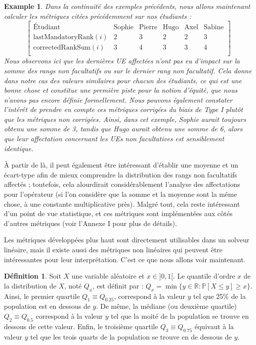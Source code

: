 \documentclass{rapport}
\theoremstyle{definition}
\newtheorem{definition}{Définition}
\theoremstyle{remark}
\theoremstyle{plain}
\newtheorem{example}{Example}
\theoremstyle{definition}
\theoremstyle{definition}
\theoremstyle{remark}
\theoremstyle{definition}
\begin{document}
\begin{example}\label{ex:running3}
    Dans la continuité des exemples précédents, nous allons maintenant calculer les métriques citées précédemment sur nos étudiants :
    $$
    \begin{bmatrix}
        \text{Étudiant} & \text{Sophie} & \text{Pierre} & \text{Hugo} & \text{Axel} & \text{Sabine}\\
        \text{lastMandatoryRank}(i) & 2 & 3 & 2 & 2 & 3\\
        \text{correctedRankSum}(i) & 3 & 4 & 3 & 3 & 4\\
    \end{bmatrix}
    $$
    Nous observons ici que les dernières UE affectées n'ont pas eu d'impact sur la somme des rangs non facultatifs ou sur le dernier rang non facultatif. Cela donne dans notre cas des valeurs similaires pour chacun des étudiants, ce qui est une bonne chose et constitue une première piste pour la notion d'équité, que nous n'avons pas encore définie formellement.
    Nous pouvons également constater l'intérêt de prendre en compte ces métriques corrigées du biais de Type I plutôt que les métriques non corrigées. Ainsi, dans cet exemple, Sophie aurait toujours obtenu une somme de 3, tandis que Hugo aurait obtenu une somme de 6, alors que leur affectation concernant les UEs non facultatives est sensiblement identique.
\end{example}

À partir de là, il peut également être intéressant d'établir une moyenne et un écart-type afin de mieux comprendre la distribution des rangs non facultatifs affectés ; toutefois, cela alourdirait considérablement l'analyse des affectations pour l'opérateur (si l'on considère que la somme et la moyenne sont la même chose, à une constante multiplicative près). Malgré tout, cela reste intéressant d'un point de vue statistique, et ces métriques sont implémentées aux côtés d'autres métriques (voir l'Annexe I pour plus de détails).

Les métriques développées plus haut sont directement utilisables dans un solveur linéaire, mais il existe aussi des métriques non linéaires qui peuvent être intéressantes pour leur interprétation. C'est ce que nous allons voir maintenant.

\begin{definition}
    Soit $X$ une variable aléatoire et $x\in]0,1[$. Le quantile d'ordre $x$ de la distribution de $X$, noté $Q_x$, est définit par : $Q_x = \min\{y\in\mathbb{R} : \mathbb{P}[X\le y]\ge x\}$.
    Ainsi, le premier quartile $Q_1 \equiv Q_{0.25}$, correspond à la valeur $y$ tel que 25\% de la population est en dessous de $y$.
    De même, la médiane (ou deuxième quartile) $Q_2\equiv Q_{0.5}$ correspond à la valeur $y$ tel que la moité de la population se trouve en dessous de cette valeur.
    Enfin, le troisième quartile $Q_3\equiv Q_{0.75}$ équivaut à la valeur $y$ tel que les trois quarts de la population se trouve en de dessous de $y$.
\end{definition}
\end{document}
